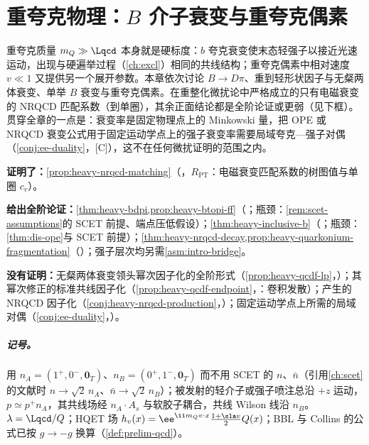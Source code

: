 \chapter{重夸克物理：$B$ 介子衰变与重夸克偶素}\label{ch:heavy}

重夸克质量 $m_Q\gg\Lqcd$ 本身就是硬标度：$b$ 夸克衰变使末态轻强子以接近光速运动，出现与硬遍举过程（\cref{ch:excl}）相同的共线结构；重夸克偶素中相对速度 $v\ll1$ 又提供另一个展开参数。本章依次讨论 $B\to D\pi$、重到轻形状因子与无粲两体衰变、单举 $B$ 衰变与重夸克偶素。在重整化微扰论中严格成立的只有电磁衰变的 NRQCD 匹配系数（到单圈），其余正面结论都是全阶论证或更弱（见下框）。贯穿全章的一点是：衰变率是固定物理点上的 Minkowski 量，把 OPE 或 NRQCD 衰变公式用于固定运动学点上的强子衰变率需要局域夸克—强子对偶（\cref{conj:ee-duality}，[C]），这不在任何微扰证明的范围之内。

\begin{tcolorbox}[enhanced,breakable,title=本章证明了什么／没有证明什么,fonttitle=\bfseries,
  colback=gray!3!white,colframe=gray!55!black,boxrule=0.6pt,arc=2pt,
  left=5pt,right=5pt,top=3pt,bottom=3pt,before skip=6pt,after skip=6pt]
\textbf{证明了：}\cref{prop:heavy-nrqcd-matching}（\tagR，$R_{\mathrm{PT}}$：电磁衰变匹配系数的树图值与单圈 $c_v$）。\par
\textbf{给出全阶论证：}\cref{thm:heavy-bdpi,prop:heavy-btopi-ff}（\tagA；瓶颈：\cref{rem:scet-assumptions}的 SCET 前提、端点压低假设）；\cref{thm:heavy-inclusive-b}（\tagA；瓶颈：\cref{thm:dis-ope}与 SCET 前提）；\cref{thm:heavy-nrqcd-decay,prop:heavy-quarkonium-fragmentation}（\tagA）；强子层次均另需\cref{asm:intro-bridge}。\par
\textbf{没有证明：}无粲两体衰变领头幂次因子化的全阶形式（\cref{prop:heavy-qcdf-lp}，\tagP）；其幂次修正的标准共线因子化（\cref{prop:heavy-qcdf-endpoint}，\tagV：卷积发散）；产生的 NRQCD 因子化（\cref{conj:heavy-nrqcd-production}，\tagC）；固定运动学点上所需的局域对偶（\cref{conj:ee-duality}，\tagC）。
\end{tcolorbox}

\paragraph{记号。}
用 $n_A=(1^+,0^-,\mathbf 0_T)$、$n_B=(0^+,1^-,\mathbf 0_T)$ 而不用 SCET 的 $n$、$\bar n$（引用\cref{ch:scet}的文献时 $n\to\sqrt2\,n_A$、$\bar n\to\sqrt2\,n_B$）；被发射的轻介子或强子喷注总沿 $+z$ 运动，$p\simeq p^+n_A$，其共线场经 $n_A\cdot A_s$ 与软胶子耦合，共线 Wilson 线沿 $n_B$。$\lambda=\Lqcd/Q$；HQET 场 $h_v(x)=\ee^{\ii m_Qv\cdot x}\frac{1+\sla v}{2}Q(x)$；BBL 与 Collins 的公式已按 $g\to-g$ 换算（\cref{def:prelim-qcd}）。

